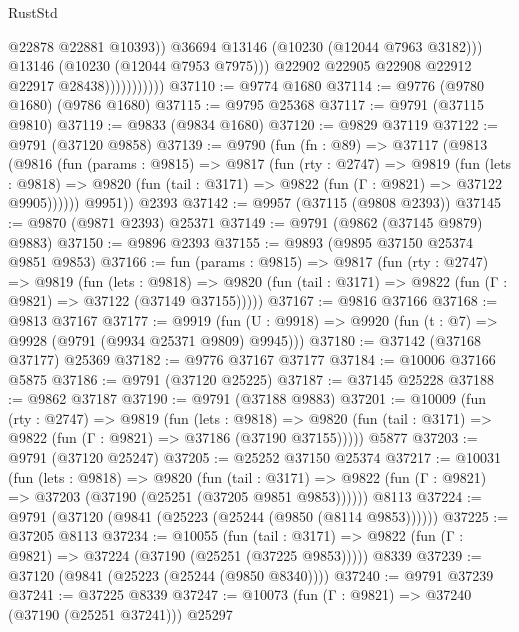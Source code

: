 \begin{lexlean}{RustStd}
\begin{coremodule}
                                  @22878
                                  @22881
                                  @10393))
                              @36694
                              @13146
                              (@10230 (@12044 @7963 @3182)))
                            @13146
                            (@10230 (@12044 @7953 @7975)))
                          @22902
                          @22905
                          @22908
                          @22912
                          @22917
                          @28438)))))))))))
@37110 := @9774 @1680
@37114 := @9776 (@9780 @1680) (@9786 @1680)
@37115 := @9795 @25368
@37117 := @9791 (@37115 @9810)
@37119 := @9833 (@9834 @1680)
@37120 := @9829 @37119
@37122 := @9791 (@37120 @9858)
@37139 := @9790
    (fun (fn : @89) =>
    @37117
      (@9813
        (@9816
          (fun (params : @9815) =>
          @9817
            (fun (rty : @2747) =>
            @9819
              (fun (lets : @9818) =>
              @9820 (fun (tail : @3171) => @9822 (fun (Γ : @9821) => @37122 @9905))))))
        @9951))
    @2393
@37142 := @9957 (@37115 (@9808 @2393))
@37145 := @9870 (@9871 @2393) @25371
@37149 := @9791 (@9862 (@37145 @9879) @9883)
@37150 := @9896 @2393
@37155 := @9893 (@9895 @37150 @25374 @9851 @9853)
@37166 := fun (params : @9815) =>
  @9817
    (fun (rty : @2747) =>
    @9819
      (fun (lets : @9818) =>
      @9820 (fun (tail : @3171) => @9822 (fun (Γ : @9821) => @37122 (@37149 @37155)))))
@37167 := @9816 @37166
@37168 := @9813 @37167
@37177 := @9919
    (fun (U : @9918) => @9920 (fun (t : @7) => @9928 (@9791 (@9934 @25371 @9809) @9945)))
@37180 := @37142 (@37168 @37177) @25369
@37182 := @9776 @37167 @37177
@37184 := @10006 @37166 @5875
@37186 := @9791 (@37120 @25225)
@37187 := @37145 @25228
@37188 := @9862 @37187
@37190 := @9791 (@37188 @9883)
@37201 := @10009
    (fun (rty : @2747) =>
    @9819
      (fun (lets : @9818) =>
      @9820 (fun (tail : @3171) => @9822 (fun (Γ : @9821) => @37186 (@37190 @37155)))))
    @5877
@37203 := @9791 (@37120 @25247)
@37205 := @25252 @37150 @25374
@37217 := @10031
    (fun (lets : @9818) =>
    @9820
      (fun (tail : @3171) =>
      @9822 (fun (Γ : @9821) => @37203 (@37190 (@25251 (@37205 @9851 @9853))))))
    @8113
@37224 := @9791 (@37120 (@9841 (@25223 (@25244 (@9850 (@8114 @9853))))))
@37225 := @37205 @8113
@37234 := @10055
    (fun (tail : @3171) => @9822 (fun (Γ : @9821) => @37224 (@37190 (@25251 (@37225 @9853)))))
    @8339
@37239 := @37120 (@9841 (@25223 (@25244 (@9850 @8340))))
@37240 := @9791 @37239
@37241 := @37225 @8339
@37247 := @10073 (fun (Γ : @9821) => @37240 (@37190 (@25251 @37241))) @25297

\end{coremodule}
\end{lexlean}

